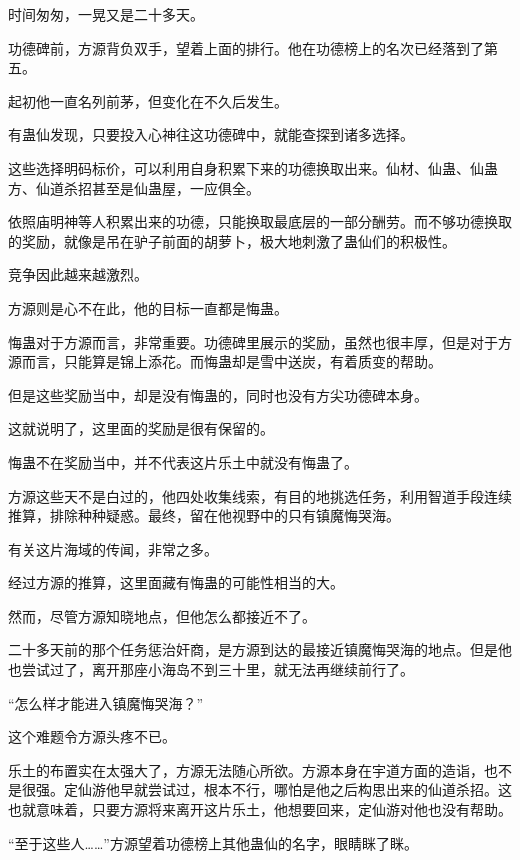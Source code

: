 
\begin{this_body}



时间匆匆，一晃又是二十多天。

功德碑前，方源背负双手，望着上面的排行。他在功德榜上的名次已经落到了第五。

起初他一直名列前茅，但变化在不久后发生。

有蛊仙发现，只要投入心神往这功德碑中，就能查探到诸多选择。

这些选择明码标价，可以利用自身积累下来的功德换取出来。仙材、仙蛊、仙蛊方、仙道杀招甚至是仙蛊屋，一应俱全。

依照庙明神等人积累出来的功德，只能换取最底层的一部分酬劳。而不够功德换取的奖励，就像是吊在驴子前面的胡萝卜，极大地刺激了蛊仙们的积极性。

竞争因此越来越激烈。

方源则是心不在此，他的目标一直都是悔蛊。

悔蛊对于方源而言，非常重要。功德碑里展示的奖励，虽然也很丰厚，但是对于方源而言，只能算是锦上添花。而悔蛊却是雪中送炭，有着质变的帮助。

但是这些奖励当中，却是没有悔蛊的，同时也没有方尖功德碑本身。

这就说明了，这里面的奖励是很有保留的。

悔蛊不在奖励当中，并不代表这片乐土中就没有悔蛊了。

方源这些天不是白过的，他四处收集线索，有目的地挑选任务，利用智道手段连续推算，排除种种疑惑。最终，留在他视野中的只有镇魔悔哭海。

有关这片海域的传闻，非常之多。

经过方源的推算，这里面藏有悔蛊的可能性相当的大。

然而，尽管方源知晓地点，但他怎么都接近不了。

二十多天前的那个任务惩治奸商，是方源到达的最接近镇魔悔哭海的地点。但是他也尝试过了，离开那座小海岛不到三十里，就无法再继续前行了。

“怎么样才能进入镇魔悔哭海？”

这个难题令方源头疼不已。

乐土的布置实在太强大了，方源无法随心所欲。方源本身在宇道方面的造诣，也不是很强。定仙游他早就尝试过，根本不行，哪怕是他之后构思出来的仙道杀招。这也就意味着，只要方源将来离开这片乐土，他想要回来，定仙游对他也没有帮助。

“至于这些人……”方源望着功德榜上其他蛊仙的名字，眼睛眯了眯。


\end{this_body}

